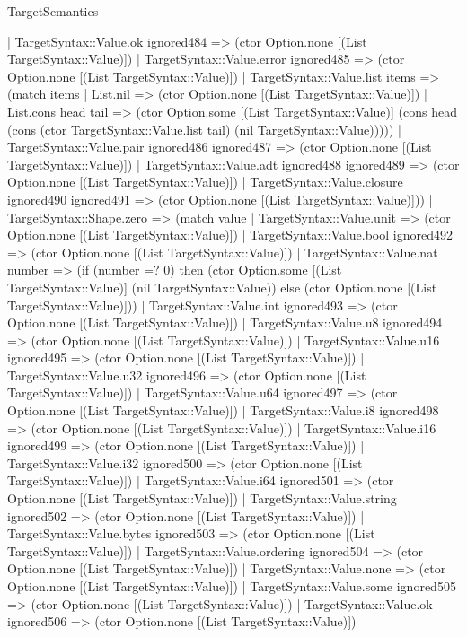 \begin{lexlean}{TargetSemantics}
\begin{semanticmodule}
{      | TargetSyntax::Value.ok ignored484 => (ctor Option.none [(List TargetSyntax::Value)])
      | TargetSyntax::Value.error ignored485 => (ctor Option.none [(List TargetSyntax::Value)])
      | TargetSyntax::Value.list items => (match items
        | List.nil => (ctor Option.none [(List TargetSyntax::Value)])
        | List.cons head tail => (ctor Option.some [(List TargetSyntax::Value)] (cons head (cons (ctor TargetSyntax::Value.list tail) (nil TargetSyntax::Value)))))
      | TargetSyntax::Value.pair ignored486 ignored487 => (ctor Option.none [(List TargetSyntax::Value)])
      | TargetSyntax::Value.adt ignored488 ignored489 => (ctor Option.none [(List TargetSyntax::Value)])
      | TargetSyntax::Value.closure ignored490 ignored491 => (ctor Option.none [(List TargetSyntax::Value)]))
    | TargetSyntax::Shape.zero => (match value
      | TargetSyntax::Value.unit => (ctor Option.none [(List TargetSyntax::Value)])
      | TargetSyntax::Value.bool ignored492 => (ctor Option.none [(List TargetSyntax::Value)])
      | TargetSyntax::Value.nat number => (if (number =? 0) then (ctor Option.some [(List TargetSyntax::Value)] (nil TargetSyntax::Value)) else (ctor Option.none [(List TargetSyntax::Value)]))
      | TargetSyntax::Value.int ignored493 => (ctor Option.none [(List TargetSyntax::Value)])
      | TargetSyntax::Value.u8 ignored494 => (ctor Option.none [(List TargetSyntax::Value)])
      | TargetSyntax::Value.u16 ignored495 => (ctor Option.none [(List TargetSyntax::Value)])
      | TargetSyntax::Value.u32 ignored496 => (ctor Option.none [(List TargetSyntax::Value)])
      | TargetSyntax::Value.u64 ignored497 => (ctor Option.none [(List TargetSyntax::Value)])
      | TargetSyntax::Value.i8 ignored498 => (ctor Option.none [(List TargetSyntax::Value)])
      | TargetSyntax::Value.i16 ignored499 => (ctor Option.none [(List TargetSyntax::Value)])
      | TargetSyntax::Value.i32 ignored500 => (ctor Option.none [(List TargetSyntax::Value)])
      | TargetSyntax::Value.i64 ignored501 => (ctor Option.none [(List TargetSyntax::Value)])
      | TargetSyntax::Value.string ignored502 => (ctor Option.none [(List TargetSyntax::Value)])
      | TargetSyntax::Value.bytes ignored503 => (ctor Option.none [(List TargetSyntax::Value)])
      | TargetSyntax::Value.ordering ignored504 => (ctor Option.none [(List TargetSyntax::Value)])
      | TargetSyntax::Value.none => (ctor Option.none [(List TargetSyntax::Value)])
      | TargetSyntax::Value.some ignored505 => (ctor Option.none [(List TargetSyntax::Value)])
      | TargetSyntax::Value.ok ignored506 => (ctor Option.none [(List TargetSyntax::Value)])
}
\end{semanticmodule}
\end{lexlean}
